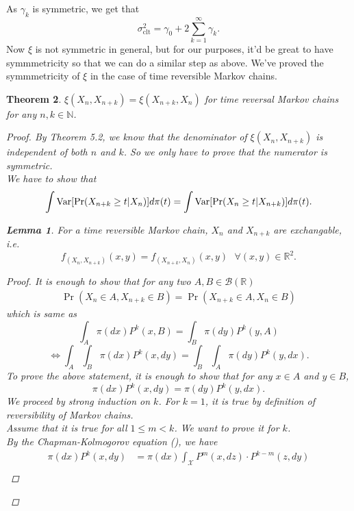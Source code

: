 \documentclass{article}
\newtheorem{theorem}{Theorem}[section]
\newtheorem{lemma}[theorem]{Lemma}
\begin{document}
	As $\gamma_k$ is symmetric, we get that
	$$\sigma_{\text{clt}}^2 = \gamma_0 + 2\sum_{k=1}^{\infty} \gamma_k.$$
	Now $\xi$ is not symmetric in general, but for our purposes, it'd be great to have symmmetricity so that we can do a similar step as above.
	We've proved the symmmetricity of $\xi$ in the case of time reversible Markov chains.

	\begin{theorem}
		$\xi(X_n, X_{n+k}) = \xi(X_{n+k}, X_n)$ for time reversal Markov chains for any $n, k \in \mathbb{N}$.
		\begin{proof}
			By Theorem 5.2, we know that the denominator of $\xi(X_n, X_{n+k})$ is independent of both $n$ and $k$. So we only have to prove that the numerator is symmetric. \\
			We have to show that
			\begin{equation*}
				\int \text{Var} [\Pr (X_{n+k} \geq t | X_n)] d\pi(t) = \int \text{Var} [\Pr (X_n \geq t | X_{n+k})] d\pi(t).
			\end{equation*}
			\begin{lemma}
				For a time reversible Markov chain, $X_n$ and $X_{n+k}$ are exchangable, i.e.
				\begin{equation*}
					f_{(X_{n}, X_{n+k})}(x, y) = f_{(X_{n+k}, X_{n})}(x, y) \text{  } \forall (x, y) \in \mathbb{R}^2.
				\end{equation*}
				\begin{proof}
					It is enough to show that for any two $A, B \in \mathcal{B}(\mathbb{R})$
					\begin{align*}
						\Pr(X_n \in A, X_{n+k} \in B) = \Pr(X_{n+k} \in A, X_{n} \in B)
					\end{align*}
					which is same as
						$$\int_A \pi(dx) P^k(x, B) = \int_B \pi(dy) P^k(y, A)$$
						$$\Longleftrightarrow\int_A \int_B \pi(dx) P^k(x, dy) = \int_B \int_A \pi(dy) P^k(y, dx).$$
					To prove the above statement, it is enough to show that for any $x \in A$ and $y \in B$,
					$$\pi(dx) P^k(x, dy) = \pi(dy) P^k(y, dx).$$
					We proceed by strong induction on $k$.
					For $k = 1$, it is true by definition of reversibility of Markov chains.\\
					Assume that it is true for all $1 \leq m < k$.
					We want to prove it for $k$.\\
					By the Chapman-Kolmogorov equation (\cite{mcmc2011handbook}), we have
					\begin{align*}
						\pi(dx) P^k(x, dy) &= \pi(dx) \int_{\mathcal{X}} P^m(x, dz)\cdot P^{k-m}(z, dy)\\

\end{align*}
\end{proof}
\end{lemma}
\end{proof}
\end{theorem}
\end{document}
